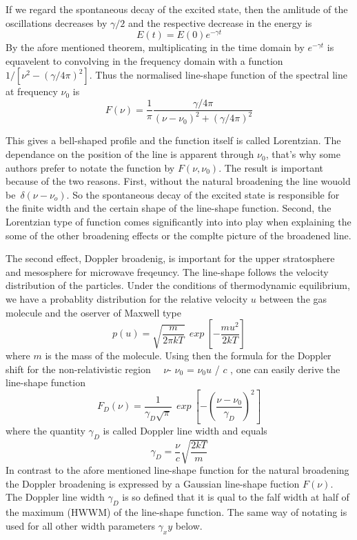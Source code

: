 If we regard the spontaneous decay of the excited state, then the
amlitude of the oscillations decreases by $\gamma/2$ and the
respective decrease in the energy is
\begin{equation}
  E(t)=E(0)e^{-\gamma t}
\label{}
\end{equation}
By the afore mentioned theorem, multiplicating in the time domain by
$e^{-\gamma t}$ is equavelent to convolving in the frequency domain
with a function $1/[\nu^2 - (\gamma/4\pi)^2]$. Thus the normalised
line-shape function of the spectral line at frequency $\nu_0$ is 
\begin{equation}
  F(\nu)=\frac{1}{\pi}\frac{\gamma/4\pi}{(\nu - \nu_0)^2 + (\gamma/4\pi)^2}
\label{}
\end{equation}

This gives a bell-shaped profile and the function itself is called
Lorentzian. The dependance on the position of the line is apparent
through $\nu_0$, that's why some authors prefer to notate the function
by $F(\nu,\nu_0)$.
The result is important because of the two reasons. First, without the
natural broadening the line wouold be~$\delta (\nu - \nu_o)$. So the
spontaneous decay of the excited state is responsible for the finite
width and the certain shape of the line-shape function. Second, the
Lorentzian type of function comes significantly into into play when
explaining the some of the other broadening effects or the complte
picture of the broadened line.

The second effect, Doppler broadenig, is important for the upper
stratosphere and mesosphere for microwave freqeuncy. The line-shape
follows the velocity distribution of the particles. Under the conditions
of thermodynamic equilibrium, we have  a probablity distribution for
the relative velocity $u$ between the gas molecule and the oserver 
of Maxwell type 
\begin{equation}
  p(u)=\sqrt{\frac{m}{2\pi kT}}~~exp~\left[-\frac{mu^2}{2kT}\right]
\label{}
\end{equation}
where $m$ is the mass of the molecule. Using then the formula for the
Doppler shift for the non-relativistic region~~  $\nu$- $\nu_0$ =
$\nu_0$$u$ / $c$ , one can easily derive the line-shape function 
\begin{equation}
 F_D(\nu)=\frac{1}{\gamma_D\sqrt{\pi}}~~exp~\left[-\left(\frac{\nu - \nu_0}{\gamma_D}\right)^2\right]
\label{}
\end{equation}
where the quantity $\gamma_D$ is called Doppler line width and equals
\begin{equation}
 \gamma_D=\frac{\nu}{c}\sqrt{\frac{2kT}{m}}
\label{}
\end{equation}
In contrast to the afore mentioned line-shape function for the natural
broadening the Doppler broadening is expressed by a Gaussian
line-shape fuction $F(\nu)$. The Doppler line width $\gamma_D$ is so
defined that it is qual to the falf width at half of the maximum
(HWWM) of the line-shape function. The same way of notating is used
for all other width parameters $\gamma_xy$ below.

